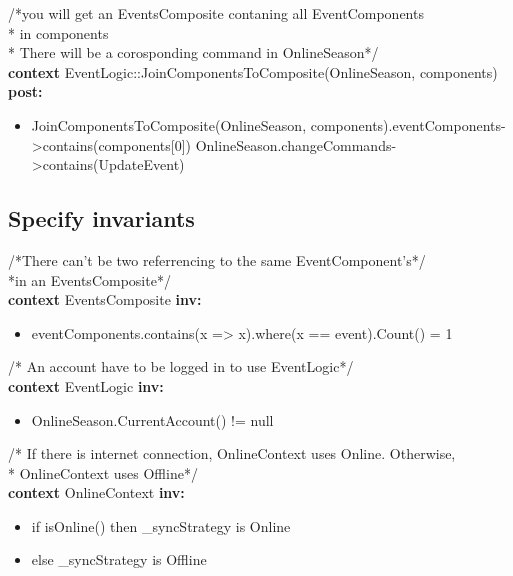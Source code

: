 \documentclass[a4paper]{article}
\begin{document}
\noindent 
/*you will get an EventsComposite contaning all EventComponents\\
* in components\\
* There will be a corosponding command in OnlineSeason*/\\   
\textbf{context} EventLogic::JoinComponentsToComposite(OnlineSeason, components) \textbf{post:}
\begin{itemize}[noitemsep,nolistsep]
\item[] JoinComponentsToComposite(OnlineSeason, components).eventComponents->contains(components[0])
\subitem OnlineSeason.changeCommands->contains(UpdateEvent)\\
\end{itemize}


\subsection{Specify invariants}


\noindent
/*There can't be two referrencing to the same EventComponent's*/\\
*in an EventsComposite*/\\
\textbf{context} EventsComposite \textbf{inv:}
\begin{itemize}[noitemsep,nolistsep]
\item[] eventComponents.contains(x => x).where(x == event).Count() = 1\\
\end{itemize}

\noindent
/* An account have to be logged in to use EventLogic*/\\
\textbf{context} EventLogic \textbf{inv:}
\begin{itemize}[noitemsep,nolistsep]
\item[] OnlineSeason.CurrentAccount() != null\\
\end{itemize}

\noindent
/* If there is internet connection, OnlineContext uses Online. Otherwise,\\
* OnlineContext uses Offline*/\\
\textbf{context} OnlineContext \textbf{inv:}
\begin{itemize}[noitemsep,nolistsep]
\item[] if isOnline() then
\subitem	\_syncStrategy is Online
\item[] else
\subitem	\_syncStrategy is Offline\\
\end{itemize}
\end{document}
